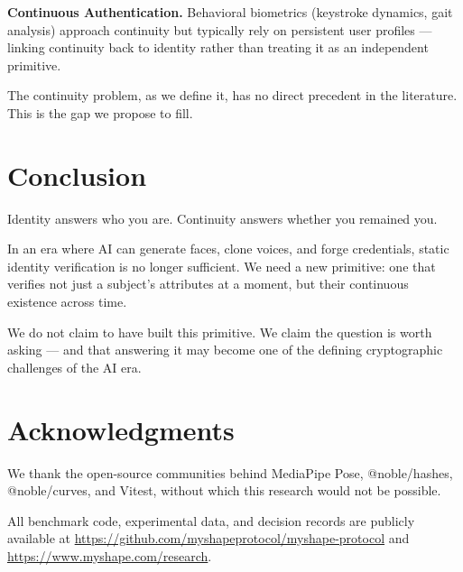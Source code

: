\documentclass[conference]{IEEEtran}
\begin{document}
\textbf{Continuous Authentication.} Behavioral biometrics (keystroke dynamics, gait analysis) approach continuity but typically rely on persistent user profiles — linking continuity back to identity rather than treating it as an independent primitive.

The continuity problem, as we define it, has no direct precedent in the literature. This is the gap we propose to fill.

\section{Conclusion}

Identity answers who you are. Continuity answers whether you remained you.

In an era where AI can generate faces, clone voices, and forge credentials, static identity verification is no longer sufficient. We need a new primitive: one that verifies not just a subject's attributes at a moment, but their continuous existence across time.

We do not claim to have built this primitive. We claim the question is worth asking — and that answering it may become one of the defining cryptographic challenges of the AI era.

\section*{Acknowledgments}

We thank the open-source communities behind MediaPipe Pose, @noble/hashes, @noble/curves, and Vitest, without which this research would not be possible.

All benchmark code, experimental data, and decision records are publicly available at \url{https://github.com/myshapeprotocol/myshape-protocol} and \url{https://www.myshape.com/research}.
\end{document}

